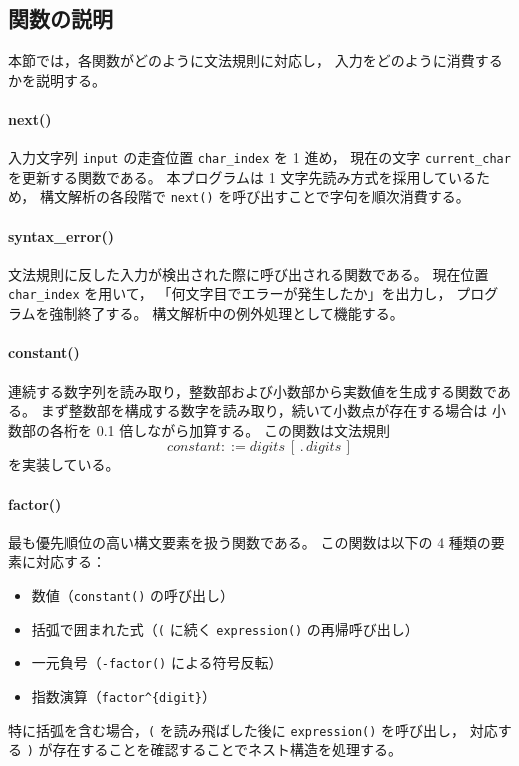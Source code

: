 \documentclass[a4paper,12pt,titlepage]{jsarticle}
\begin{document}
\subsection{関数の説明}
本節では，各関数がどのように文法規則に対応し，
入力をどのように消費するかを説明する。

\paragraph{next()}
入力文字列 \verb|input| の走査位置 \verb|char_index| を 1 進め，
現在の文字 \verb|current_char| を更新する関数である。
本プログラムは 1 文字先読み方式を採用しているため，
構文解析の各段階で \verb|next()| を呼び出すことで字句を順次消費する。

\paragraph{syntax\_error()}
文法規則に反した入力が検出された際に呼び出される関数である。
現在位置 \verb|char_index| を用いて，
「何文字目でエラーが発生したか」を出力し，
プログラムを強制終了する。
構文解析中の例外処理として機能する。

\paragraph{constant()}
連続する数字列を読み取り，整数部および小数部から実数値を生成する関数である。
まず整数部を構成する数字を読み取り，続いて小数点が存在する場合は
小数部の各桁を 0.1 倍しながら加算する。
この関数は文法規則
\[
constant ::= digits\ [\,.\, digits\,]
\]
を実装している。

\paragraph{factor()}
最も優先順位の高い構文要素を扱う関数である。
この関数は以下の 4 種類の要素に対応する：

\begin{itemize}
    \item 数値（\verb|constant()| の呼び出し）
    \item 括弧で囲まれた式（\verb|(| に続く \verb|expression()| の再帰呼び出し）
    \item 一元負号（\verb|-factor()| による符号反転）
    \item 指数演算（\verb|factor^{digit}|）
\end{itemize}

特に括弧を含む場合，\verb|(| を読み飛ばした後に \verb|expression()| を呼び出し，
対応する \verb|)| が存在することを確認することでネスト構造を処理する。
\end{document}
